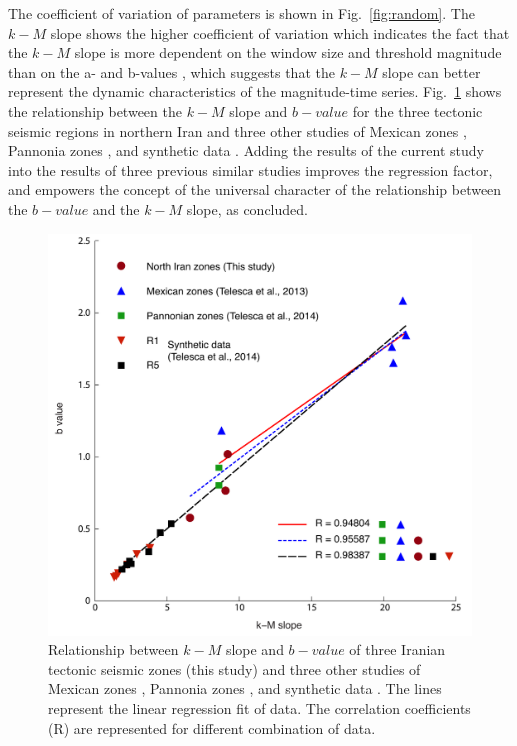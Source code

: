 \noindent
The coefficient of variation of parameters is shown in Fig.~\ref{fig:random}. The  $k-M$  slope shows the higher coefficient of variation which indicates the fact that the  $k-M$  slope is more dependent on the window size and threshold magnitude than on the a-  and  b-values , which suggests that  the $k-M$  slope can better represent the dynamic characteristics of the magnitude-time series. 
 \noindent
 Fig.~\ref{fig:regression} shows the relationship between the  $k-M$  slope and $b-value$ for the three tectonic seismic regions in northern Iran and three other studies of Mexican zones  \citep{Telesca2013}, Pannonia zones  \citep{Telesca2014}, and synthetic data \citep{Telesca2014-pone}. Adding the results of the current study into the results of three previous similar studies improves the regression factor, and empowers the concept of the universal character of the relationship between the  $b-value$  and the  $k-M$  slope, as  \citet{Telesca2014} concluded. 
 
\begin{figure} [ht]
\centering
\includegraphics[scale=0.6]{figures/pdf/Figure08.pdf} 
\caption{ Relationship between $k-M$ slope and $b-value$ of three Iranian tectonic seismic zones (this study) and three other studies of Mexican zones \citep{Telesca2013}, Pannonia zones \citep{Telesca2014}, and synthetic data \citep{Telesca2014-pone}. The lines represent the linear regression fit of data. The correlation coefficients (R) are represented for different combination of data.}
\label{fig:regression}
\end{figure}

